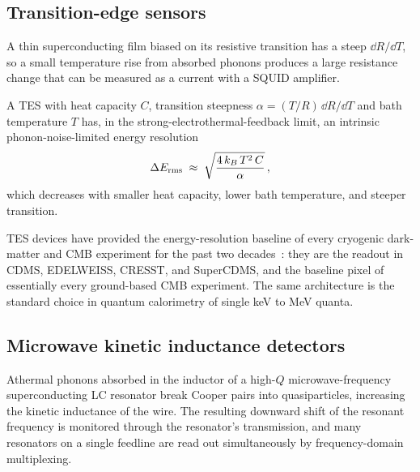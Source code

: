 \subsection{Transition-edge sensors}
\label{sec:tes}

\begin{phenomenon}
A thin superconducting film biased on its resistive transition has
a steep $\dd R/\dd T$, so a small temperature rise from absorbed
phonons produces a large resistance change that can be measured as
a current with a SQUID amplifier.
\end{phenomenon}

\begin{statement}
\label{stmt:tes-resolution}
A TES with heat capacity $C$, transition steepness
$\alpha = (T/R)\,\dd R/\dd T$ and bath temperature $T$ has, in the
strong-electrothermal-feedback limit, an intrinsic
phonon-noise-limited energy resolution
\begin{equation}
\label{eq:tes-resolution}
\Delta E_{\rm rms} \;\approx\; \sqrt{\frac{4\,k_B\,T^2\,C}{\alpha}}\,,
\end{equation}
which decreases with smaller heat capacity, lower bath temperature,
and steeper transition.
\end{statement}

\begin{remark}
TES devices have provided the energy-resolution baseline of every
cryogenic dark-matter and CMB experiment for the past two
decades~\cite{irwin2005}: they are the readout in CDMS, EDELWEISS,
CRESST, and SuperCDMS, and the baseline pixel of essentially every
ground-based CMB experiment. The same architecture is the
standard choice in quantum calorimetry of single keV to MeV
quanta.
\end{remark}

\subsection{Microwave kinetic inductance detectors}
\label{sec:kid}

\begin{phenomenon}
Athermal phonons absorbed in the inductor of a high-$Q$
microwave-frequency superconducting LC resonator break Cooper
pairs into quasiparticles, increasing the kinetic inductance of
the wire. The resulting downward shift of the resonant frequency
is monitored through the resonator's transmission, and many
resonators on a single feedline are read out simultaneously by
frequency-domain multiplexing.
\end{phenomenon}

